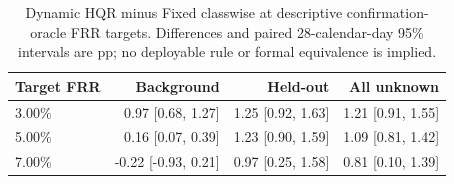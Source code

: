 \begingroup\small\setlength{\tabcolsep}{3pt}
\begin{table}[tbp]
\centering
\caption{Dynamic HQR minus Fixed classwise at descriptive confirmation-oracle FRR targets. Differences and paired 28-calendar-day 95\% intervals are pp; no deployable rule or formal equivalence is implied.}\label{tab:fixedclass-oracle}
\begin{tabular}{lrrr}
\toprule
Target FRR & Background & Held-out & All unknown\\
\midrule
3.00\% & 0.97 [0.68, 1.27] & 1.25 [0.92, 1.63] & 1.21 [0.91, 1.55]\\
5.00\% & 0.16 [0.07, 0.39] & 1.23 [0.90, 1.59] & 1.09 [0.81, 1.42]\\
7.00\% & -0.22 [-0.93, 0.21] & 0.97 [0.25, 1.58] & 0.81 [0.10, 1.39]\\
\bottomrule
\end{tabular}
\end{table}
\endgroup

